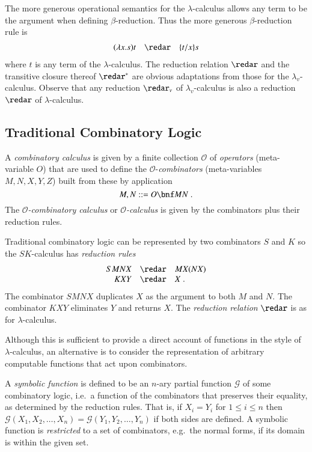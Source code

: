 \documentclass{llncs}
\renewcommand{\rew}{\redar}
\begin{document}
The more generous operational semantics for the $\lambda$-calculus allows any term to be the argument when defining $\beta$-reduction. Thus the more generous $\beta$-reduction rule is
\begin{eqnarray*}
(\lambda x.s)t \quad\rew\quad \{t/x\}s 
\end{eqnarray*}
where $t$ is any term of the $\lambda$-calculus.
The reduction relation $\rew$ and the transitive closure thereof $\rew^*$ are obvious adaptations from those for the $\lambda_v$-calculus.
Observe that any reduction $\rew_v$ of $\lambda_v$-calculus is also a reduction $\rew$ of $\lambda$-calculus.

\subsection{Traditional Combinatory Logic}
\label{ssec:sk}

A {\em combinatory calculus} is given by a finite collection ${\mathcal
  O}$ of {\em operators} (meta-variable $O$) that are
used to define the ${\mathcal O}$-{\em combinators} (meta-variables
$M,N,X,Y,Z$) built from these by application
\[
M,N ::= O \bnf MN \; .
\]
The {\em ${\mathcal O}$-combinatory calculus} or {\em ${\mathcal O}$-calculus}
is given by the combinators plus their reduction rules.


Traditional combinatory logic can be represented by two combinators $S$ and $K$ \cite{Curry58combinatorylogic} so the $SK$-calculus has {\em reduction rules}
\[
\begin{array}{rcll}
SMNX &\rew& MX(NX)\\
KXY &\rew& X \; .
\end{array}
\]
The combinator $SMNX$ duplicates $X$ as the argument to both $M$ and
$N$.  The combinator $KXY$ eliminates $Y$ and returns $X$.
The {\em reduction relation} $\rew$ is 
as for $\lambda$-calculus.


Although this is sufficient to provide a direct account of functions in the style
of $\lambda$-calculus, an alternative is to consider the representation
of arbitrary computable functions that act upon combinators.

A {\em symbolic function} is defined to be an $n$-ary partial
function ${\mathcal G}$ of some combinatory logic, i.e.~a function of
the combinators that preserves their equality, as determined by the
reduction rules.  That is, if $X_i = Y_i$ for $1\le i\le n$ then
${\mathcal G}(X_1,X_2,\ldots,X_n) = {\mathcal G}(Y_1,Y_2,\ldots, Y_n)$
if both sides are defined.  A symbolic function is {\em restricted} to
a set of combinators, e.g.\ the normal forms, if its domain is within
the given set.
\end{document}
